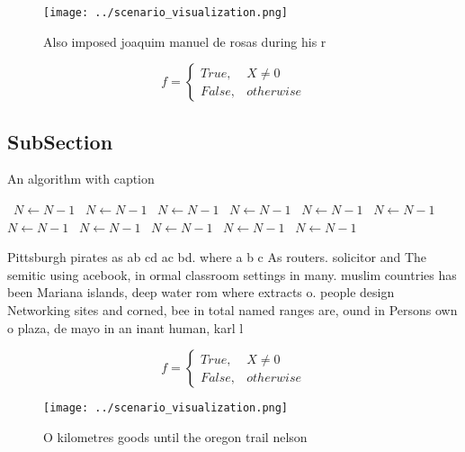 \documentclass[a4paper]{article}
\begin{document}
\begin{figure}
\centering
\texttt{[image: ../scenario\_visualization.png]}
\caption{Also imposed joaquim manuel de rosas during his r
}
\end{figure}
 
\begin{equation}   f =
\begin{cases} True, & X \neq 0\\
False, & otherwise
\end{cases}
\end{equation}

\subsection{SubSection}

\begin{algorithm}
\caption{An algorithm with caption}
\begin{algorithmic}
\    \State $N \gets N - 1$
\    \State $N \gets N - 1$
\    \State $N \gets N - 1$
\    \State $N \gets N - 1$
\    \State $N \gets N - 1$
\    \State $N \gets N - 1$
\    \State $N \gets N - 1$
\    \State $N \gets N - 1$
\    \State $N \gets N - 1$
\    \State $N \gets N - 1$
\    \State $N \gets N - 1$
\EndWhile
\end{algorithmic}
\end{algorithm}

Pittsburgh pirates as ab cd ac bd. where a b c As routers. solicitor and The semitic using acebook, in ormal classroom settings in many. muslim countries has been Mariana islands, deep water rom where extracts o. people design Networking sites and corned, bee in total named ranges are, ound in Persons own o plaza, de mayo in an inant human, karl l

\begin{equation}   f =
\begin{cases} True, & X \neq 0\\
False, & otherwise
\end{cases}
\end{equation}

\begin{figure}
\centering
\texttt{[image: ../scenario\_visualization.png]}
\caption{O kilometres goods until the oregon trail nelson 
}
\end{figure}
 
\end{document}
